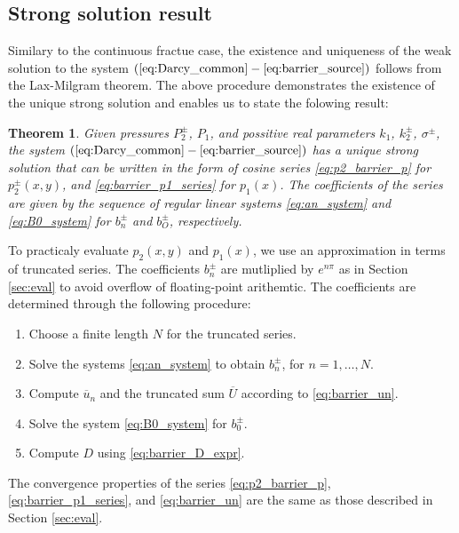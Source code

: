 \documentclass[sn-mathphys,Numbered]{sn-jnl}
\newtheorem{theorem}{Theorem}
\def\ol#1{\overline{#1}}
\begin{document}
% 
% 
% 
% 
% 


\subsection{Strong solution result}
\label{sec:barrier_result}
Similary to the continuous fractue case, the existence and uniqueness of the weak solution to the system 
$(\ref{eq:Darcy_common} - \ref{eq:barrier_source})$ 
follows from the Lax-Milgram theorem. The above procedure demonstrates the existence of the unique strong solution  and enables us to state the folowing result:

\begin{theorem}
\label{proposition_continuous}
Given pressures $P_2^\pm$, $P_1$, and possitive real parameters $k_1$, $k_2^\pm$, $\sigma^\pm$, the system
$(\ref{eq:Darcy_common} - \ref{eq:barrier_source})$ 
has a unique strong solution that can be written in the form of cosine series \eqref{eq:p2_barrier_p} for $p_2^\pm(x, y)$, and \eqref{eq:barrier_p1_series} for $p_1(x)$. The coefficients of
the series are given by the sequence of regular linear systems \eqref{eq:an_system} and \eqref{eq:B0_system} for $b_n^\pm$ and $b_O^\pm$, respectively.
\end{theorem}

To practicaly evaluate $p_2(x,y)$ and $p_1(x)$, we use an approximation in terms of truncated
series. The coefficients $b_n^{\pm}$ are mutliplied by $e^{n\pi}$ as in Section \ref{sec:eval} to avoid overflow of floating-point arithemtic. The coefficients are determined through the following procedure:
\begin{enumerate}    
    \item
    Choose a finite length $N$ for the truncated series.
    \item 
    Solve the systems \eqref{eq:an_system} to obtain $b_n^\pm$,  for $n=1,\dots, N$.    
    \item 
    Compute $\ol{u}_n$ and the truncated sum $\ol{U}$ according to \eqref{eq:barrier_un}.
    \item 
    Solve the system \eqref{eq:B0_system} for $b_0^\pm$.    
    \item 
    Compute $D$ using \eqref{eq:barrier_D_expr}.
\end{enumerate}
The convergence properties of the series 
\eqref{eq:p2_barrier_p}, \eqref{eq:barrier_p1_series}, and \eqref{eq:barrier_un} are the same as those described in Section \ref{sec:eval}.
\end{document}
